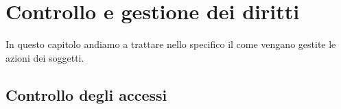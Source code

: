 \chapter{Controllo e gestione dei diritti}
In questo capitolo andiamo a trattare nello specifico il come vengano gestite le azioni dei soggetti.

\section{Controllo degli accessi}
